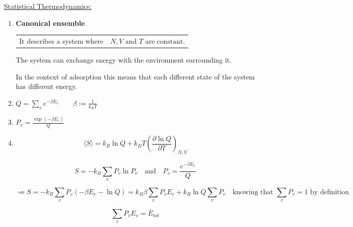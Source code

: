 \documentclass{article}
\begin{document}
\newpage

{\Large \underline{Statistical Thermodynamics:}}

\vspace{0.5cm}

\begin{enumerate}
    \item[\textbf{1.}] \textbf{Canonical ensemble}

    \vspace{0.3cm}
    \begin{tabular}{ll}
        It describes a system where & $N, V \text{ and } T \text{ are constant.}$
    \end{tabular}

    \vspace{0.2cm}
    The system can exchange energy with the environment surrounding it.

    \vspace{0.2cm}
    In the context of adsorption this means that each different state of the system has different energy.

    \vspace{0.5cm}
    \item[\textbf{2.}] $\displaystyle Q = \sum_v e^{-\beta E_v} \qquad \beta := \frac{1}{k_B T}$

    \vspace{0.5cm}
    \item[\textbf{3.}] $\displaystyle P_v = \frac{\exp(-\beta E_v)}{Q}$

    \vspace{0.5cm}
    \item[\textbf{4.}] 
    \begin{equation*}
        \langle S \rangle = k_B \ln Q + k_B T \left( \frac{\partial \ln Q}{\partial T} \right)_{N,V}
    \end{equation*}

    \begin{equation*}
        S = -k_B \sum_v P_v \ln P_v \quad \text{and} \quad P_v = \frac{e^{-\beta E_v}}{Q}
    \end{equation*}

    \begin{equation*}
        \Rightarrow S = -k_B \sum_v P_v (-\beta E_v - \ln Q) = k_B \beta \sum_v P_v E_v + k_B \ln Q \sum_v P_v \quad \text{knowing that } \sum_v P_v = 1 \text{ by definition}
    \end{equation*}

    \begin{equation*}
        \sum_v P_v E_v = \bar{E}_{\text{tot}}
    \end{equation*}


\end{enumerate}
\end{document}
